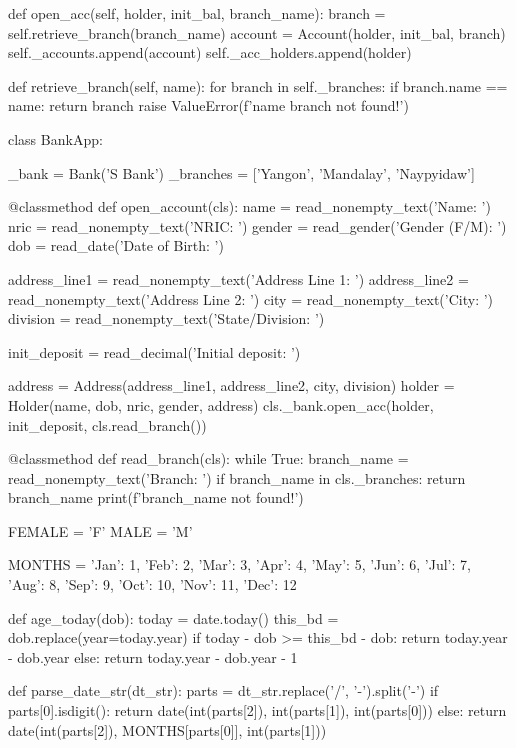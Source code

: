 \begin{py}
    def open_acc(self, holder, init_bal, branch_name):
        branch = self.retrieve_branch(branch_name)
        account = Account(holder, init_bal, branch)
        self._accounts.append(account)
        self._acc_holders.append(holder)

    def retrieve_branch(self, name):
        for branch in self._branches:
            if branch.name == name:
                return branch
        raise ValueError(f'{name} branch not found!')


class BankApp:

    _bank = Bank('S Bank')
    _branches = ['Yangon', 'Mandalay', 'Naypyidaw']

    @classmethod
    def open_account(cls):
        name = read_nonempty_text('Name: ')      
        nric = read_nonempty_text('NRIC: ')
        gender = read_gender('Gender (F/M): ')
        dob = read_date('Date of Birth: ')

        address_line1 = read_nonempty_text('Address Line 1: ')
        address_line2 = read_nonempty_text('Address Line 2: ')
        city = read_nonempty_text('City: ')
        division = read_nonempty_text('State/Division: ')

        init_deposit = read_decimal('Initial deposit: ')

        address = Address(address_line1, address_line2, city, division)
        holder = Holder(name, dob, nric, gender, address)
        cls._bank.open_acc(holder, init_deposit, cls.read_branch())

    @classmethod
    def read_branch(cls):
        while True:
            branch_name = read_nonempty_text('Branch: ')
            if branch_name in cls._branches:
                return branch_name
            print(f'{branch_name} not found!')


FEMALE = 'F'
MALE = 'M'

MONTHS = {'Jan': 1, 'Feb': 2, 'Mar': 3, 'Apr': 4,
          'May': 5, 'Jun': 6, 'Jul': 7, 'Aug': 8,
          'Sep': 9, 'Oct': 10, 'Nov': 11, 'Dec': 12}


def age_today(dob):
    today = date.today()
    this_bd = dob.replace(year=today.year)
    if today - dob >= this_bd - dob:
        return today.year - dob.year
    else:
        return today.year - dob.year - 1


def parse_date_str(dt_str):
    parts = dt_str.replace('/', '-').split('-')
    if parts[0].isdigit():
        return date(int(parts[2]), int(parts[1]), int(parts[0]))
    else:
        return date(int(parts[2]), MONTHS[parts[0]], int(parts[1]))



\end{py}
